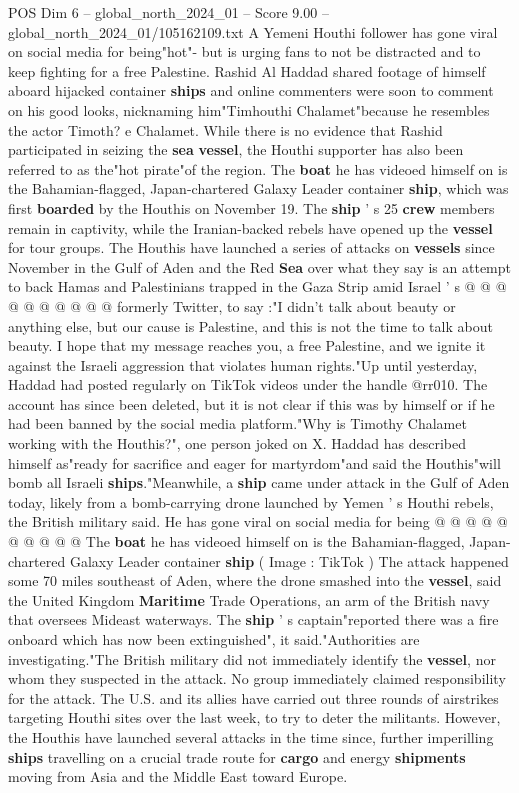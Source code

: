 \begin{textsample}{POS Dim 6 – global\_north\_2024\_01 – Score 9.00 – global\_north\_2024\_01/105162109.txt}  \label{ex:f6_pos_095}
A Yemeni Houthi follower has gone viral on social media for being"hot"- but is urging fans to not be distracted and to keep fighting for a free Palestine.
Rashid Al Haddad shared footage of himself aboard hijacked container \textbf{ships} and online commenters were soon to comment on his good looks, nicknaming him"Timhouthi Chalamet"because he resembles the actor Timoth? e Chalamet.
While there is no evidence that Rashid participated in seizing the \textbf{sea} \textbf{vessel}, the Houthi supporter has also been referred to as the"hot pirate"of the region.
The \textbf{boat} he has videoed himself on is the Bahamian-flagged, Japan-chartered Galaxy Leader container \textbf{ship}, which was first \textbf{boarded} by the Houthis on November 19.
The \textbf{ship} ' s 25 \textbf{crew} members remain in captivity, while the Iranian-backed rebels have opened up the \textbf{vessel} for tour groups.
The Houthis have launched a series of attacks on \textbf{vessels} since November in the Gulf of Aden and the Red \textbf{Sea} over what they say is an attempt to back Hamas and Palestinians trapped in the Gaza Strip amid Israel ' s @ @ @ @ @ @ @ @ @ @ formerly Twitter, to say :"I didn't talk about beauty or anything else, but our cause is Palestine, and this is not the time to talk about beauty.
I hope that my message reaches you, a free Palestine, and we ignite it against the Israeli aggression that violates human rights."Up until yesterday, Haddad had posted regularly on TikTok videos under the handle @rr010.
The account has since been deleted, but it is not clear if this was by himself or if he had been banned by the social media platform."Why is Timothy Chalamet working with the Houthis?", one person joked on X.
Haddad has described himself as"ready for sacrifice and eager for martyrdom"and said the Houthis"will bomb all Israeli \textbf{ships}."Meanwhile, a \textbf{ship} came under attack in the Gulf of Aden today, likely from a bomb-carrying drone launched by Yemen ' s Houthi rebels, the British military said.
He has gone viral on social media for being @ @ @ @ @ @ @ @ @ @ The \textbf{boat} he has videoed himself on is the Bahamian-flagged, Japan-chartered Galaxy Leader container \textbf{ship} ( Image : TikTok ) The attack happened some 70 miles southeast of Aden, where the drone smashed into the \textbf{vessel}, said the United Kingdom \textbf{Maritime} Trade Operations, an arm of the British navy that oversees Mideast waterways.
The \textbf{ship} ' s captain"reported there was a fire onboard which has now been extinguished", it said."Authorities are investigating."The British military did not immediately identify the \textbf{vessel}, nor whom they suspected in the attack.
No group immediately claimed responsibility for the attack.
The U.S. and its allies have carried out three rounds of airstrikes targeting Houthi sites over the last week, to try to deter the militants.
However, the Houthis have launched several attacks in the time since, further imperilling \textbf{ships} travelling on a crucial trade route for \textbf{cargo} and energy \textbf{shipments} moving from Asia and the Middle East toward Europe.


\end{textsample}
